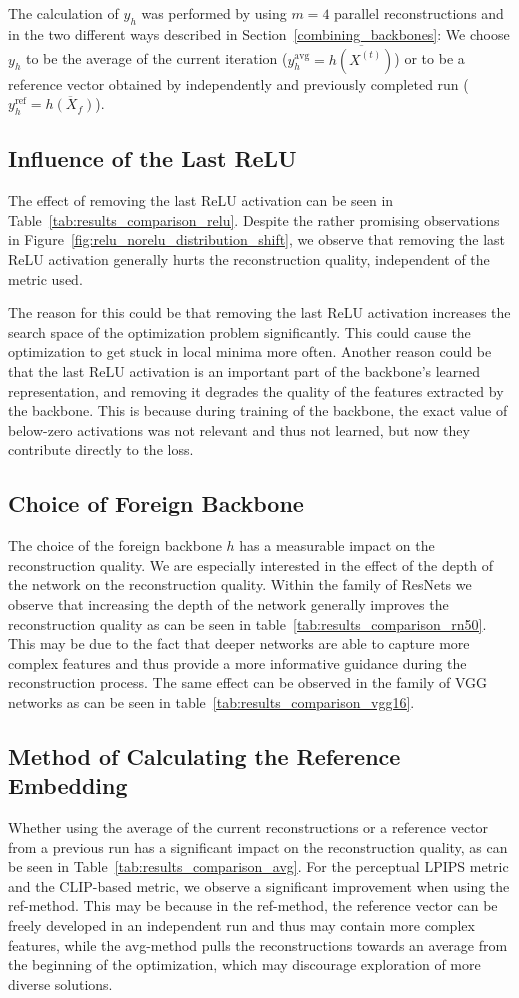 \documentclass[10pt,twocolumn]{article}
\begin{document}
The calculation of $y_h$ was performed by using $m=4$ parallel reconstructions and in the two different ways described in Section~\ref{combining_backbones}:
We choose $y_h$ to be the average of the current iteration ($y_h^\text{avg}=\overline{h(X^{(t)})}$) or to be a reference vector obtained by independently and previously completed run ($y_h^\text{ref}=\overline{h(X_f)}$).
\subsection{Influence of the Last ReLU}
The effect of removing the last ReLU activation can be seen in Table~\ref{tab:results_comparison_relu}.
Despite the rather promising observations in Figure~\ref{fig:relu_norelu_distribution_shift}, we observe that removing the last ReLU activation generally hurts the reconstruction quality, independent of the metric used.

The reason for this could be that removing the last ReLU activation increases the search space of the optimization problem significantly.
This could cause the optimization to get stuck in local minima more often.
Another reason could be that the last ReLU activation is an important part of the backbone's learned representation, and removing it degrades the quality of the features extracted by the backbone.
This is because during training of the backbone, the exact value of below-zero activations was not relevant and thus not learned, but now they contribute directly to the loss.

\subsection{Choice of Foreign Backbone}
The choice of the foreign backbone $h$ has a measurable impact on the reconstruction quality.
We are especially interested in the effect of the depth of the network on the reconstruction quality.
Within the family of ResNets we observe that increasing the depth of the network generally improves the reconstruction quality as can be seen in table~\ref{tab:results_comparison_rn50}.
This may be due to the fact that deeper networks are able to capture more complex features and thus provide a more informative guidance during the reconstruction process.
The same effect can be observed in the family of VGG networks as can be seen in table~\ref{tab:results_comparison_vgg16}.

\subsection{Method of Calculating the Reference Embedding}
Whether using the average of the current reconstructions or a reference vector from a previous run has a significant impact on the reconstruction quality, as can be seen in Table~\ref{tab:results_comparison_avg}.
For the perceptual LPIPS metric and the CLIP-based metric, we observe a significant improvement when using the ref-method.
This may be because in the ref-method, the reference vector can be freely developed in an independent run and thus may contain more complex features, while the avg-method pulls the reconstructions towards an average from the beginning of the optimization, which may discourage exploration of more diverse solutions.
\end{document}
